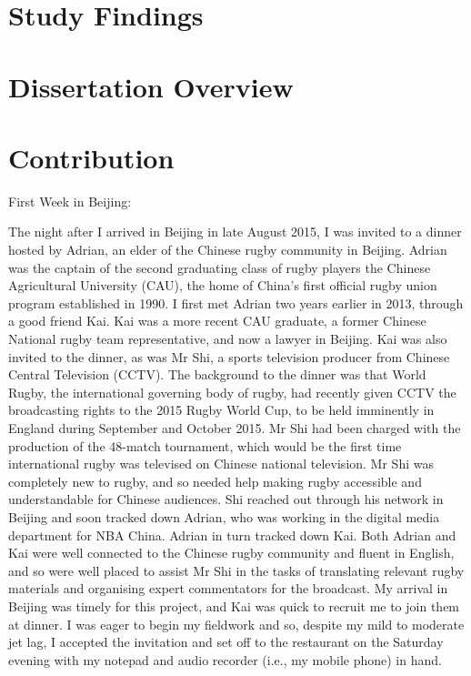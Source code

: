 \section{Study Findings}

\section{Dissertation Overview}

\section{Contribution}
















First Week in Beijing:

The night after I arrived in Beijing in late August 2015, I was invited to a dinner hosted by Adrian, an elder of the Chinese rugby community in Beijing.  Adrian was the captain of the second graduating class of rugby players the Chinese Agricultural University (CAU), the home of China's first official rugby union program established in 1990.  I first met Adrian two years earlier in 2013, through a good friend Kai. Kai was  a more recent CAU graduate, a former Chinese National rugby team representative, and now a lawyer in Beijing.  Kai was also invited to the dinner, as was Mr Shi, a sports television producer from Chinese Central Television (CCTV).  The background to the dinner was that World Rugby, the international governing body of rugby, had recently given CCTV the broadcasting rights to the 2015 Rugby World Cup, to be held imminently in England during September and October 2015.  Mr Shi had been charged with the production of the 48-match tournament, which would be the first time international rugby was televised on Chinese national television.  Mr Shi was completely new to rugby, and so needed help making rugby accessible and understandable for Chinese audiences.  Shi reached out through his network in Beijing and soon tracked down Adrian, who was working in the digital media department for NBA China. Adrian in turn tracked down Kai. Both Adrian and Kai were well connected to the Chinese rugby community and fluent in English, and so were well placed to assist Mr Shi in the tasks of translating relevant rugby materials and organising expert commentators for the broadcast.  My arrival in Beijing was timely for this project, and Kai was quick to recruit me to join them at dinner.  I was eager to begin my fieldwork and so, despite my mild to moderate jet lag, I accepted the invitation and set off to the restaurant on the Saturday evening with my notepad and audio recorder (i.e., my mobile phone) in hand.

